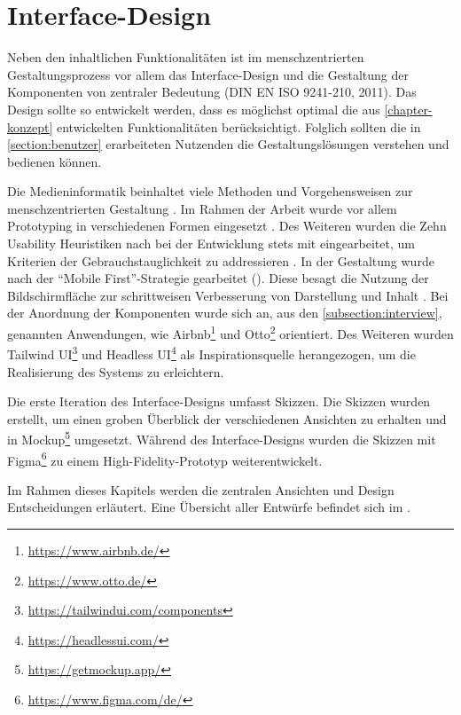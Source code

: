 \chapter{Interface-Design}
\label{chapter-design}
Neben den inhaltlichen Funktionalitäten ist im menschzentrierten Gestaltungsprozess vor allem das
Interface-Design und die Gestaltung der Komponenten von zentraler Bedeutung
\cite{din_en_iso_9421-2102020-03_din_nodate} (DIN EN ISO 9241-210, 2011). Das Design sollte so
entwickelt werden, dass es möglichst optimal die aus \ref{chapter-konzept} entwickelten
Funktionalitäten berücksichtigt. Folglich sollten die in \ref{section:benutzer} erarbeiteten
Nutzenden die Gestaltungslösungen verstehen und bedienen können.

Die Medieninformatik beinhaltet viele Methoden und Vorgehensweisen zur menschzentrierten Gestaltung
\cite{Herczeg2009}. Im Rahmen der Arbeit wurde vor allem Prototyping in verschiedenen Formen
eingesetzt \cite{herczeg_einfuhrung_2009}. Des Weiteren wurden die Zehn Usability Heuristiken nach
 bei der Entwicklung stets mit eingearbeitet, um Kriterien der
Gebrauchstauglichkeit zu addressieren . In
der Gestaltung wurde nach der \enquote{Mobile First}-Strategie gearbeitet (). Diese
besagt die Nutzung der Bildschirmfläche zur schrittweisen Verbesserung von Darstellung und Inhalt
\cite{kim_chapter_2013}. Bei der Anordnung der Komponenten wurde sich an, aus den \ref{subsection:interview}, genannten
Anwendungen, wie Airbnb\footnote{\url{https://www.airbnb.de/}} und
Otto\footnote{\url{https://www.otto.de/}} orientiert. Des Weiteren wurden Tailwind
UI\footnote{\url{https://tailwindui.com/components}} und Headless
UI\footnote{\url{https://headlessui.com/}} als Inspirationsquelle herangezogen, um die Realisierung
des Systems zu erleichtern.

Die erste Iteration des Interface-Designs umfasst Skizzen. Die Skizzen wurden erstellt, um einen
groben Überblick der verschiedenen Ansichten zu erhalten und in
Mockup\footnote{\url{https://getmockup.app/}} umgesetzt. Während des Interface-Designs wurden die
Skizzen mit Figma\footnote{\url{https://www.figma.com/de/}} zu einem High-Fidelity-Prototyp
weiterentwickelt.

Im Rahmen dieses Kapitels werden die zentralen Ansichten und Design Entscheidungen erläutert. Eine
Übersicht aller Entwürfe befindet sich im .

